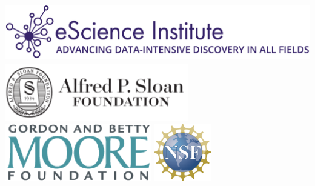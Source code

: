 \documentclass[a0,landscape]{a0poster}
\begin{document}
\begin{multicols}{3}
\includegraphics[height=2.5cm]{eSciencelogo.png}
\includegraphics[height=2.5cm]{SloanLogo.png}
\includegraphics[height=2.5cm]{MooreFdn.png}
\includegraphics[height=2.5cm]{NSFLogo}

\end{multicols}
\end{document}
